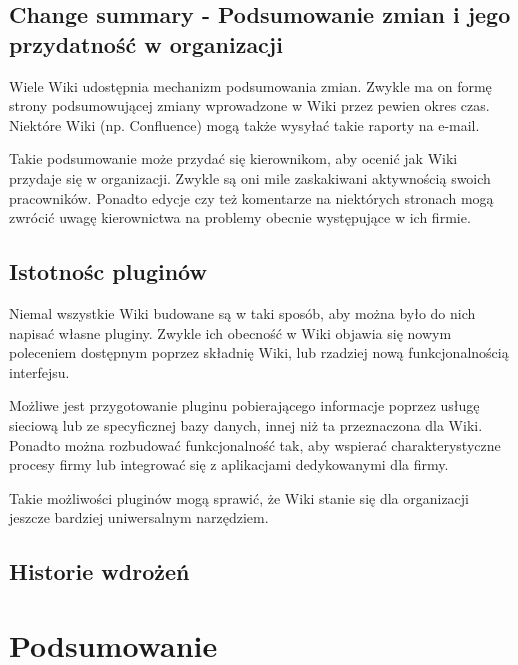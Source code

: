 \documentclass{article}
\begin{document}
	\subsection{Change summary - Podsumowanie zmian i  jego przydatność w organizacji}
	
	Wiele Wiki udostępnia mechanizm podsumowania zmian. Zwykle ma on formę strony podsumowującej zmiany wprowadzone w Wiki przez pewien okres czas. Niektóre Wiki (np. Confluence) mogą także wysyłać takie raporty na e-mail. 

	Takie podsumowanie może przydać się kierownikom, aby ocenić jak Wiki przydaje się w organizacji. Zwykle są oni mile zaskakiwani aktywnością swoich pracowników. Ponadto edycje czy też komentarze na niektórych stronach mogą zwrócić uwagę kierownictwa na problemy obecnie występujące w ich firmie. 

	\subsection{Istotnośc pluginów}

	Niemal wszystkie Wiki budowane są w taki sposób, aby można było do nich napisać własne pluginy. Zwykle ich obecność w Wiki objawia się nowym poleceniem dostępnym poprzez składnię Wiki, lub rzadziej nową funkcjonalnością interfejsu. 

Możliwe jest przygotowanie pluginu pobierającego informacje poprzez usługę sieciową lub ze specyficznej bazy danych, innej niż ta przeznaczona dla Wiki. Ponadto można rozbudować funkcjonalność tak, aby wspierać charakterystyczne procesy firmy lub integrować się z aplikacjami dedykowanymi dla firmy. 

Takie możliwości pluginów mogą sprawić, że Wiki stanie się dla organizacji jeszcze bardziej uniwersalnym narzędziem. 

	\subsection{Historie wdrożeń} %




\newpage
\section{Podsumowanie}

\newpage
\end{document}
